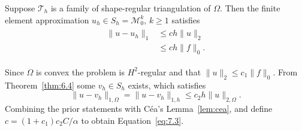 \begin{thmx}{\quad}
    Suppose $\mathcal{T}_h$ is a family of shape-regular triangulation of $\Omega$. 
    Then the finite element approximation $u_h\in S_h = \mathcal{M}^k_0$, $k\geq 1$ satisfies
    \begin{align}
        \begin{split}
            \|u-u_h\|_1&\leq ch\|u\|_2\ \\
            &\leq ch\|f\|_0.
        \end{split}
        \label{eq:7.3}
    \end{align}\label{thm:7.3}
\end{thmx}
\begin{bev}
    Since $\Omega$ is convex the problem is $H^2$-regular and that $\|u\|_2 \leq c_1\|f\|_0$.
    From Theorem~\ref{thm:6.4} some $v_h\in S_h$ exists, which satisfies
    \begin{equation}
    \|u-v_h\|_{1,\Omega} = \|u-v_h\|_{1,h} \leq c_2h\|u\|_{2,\Omega}.
    \end{equation}
    Combining the prior statements with Céa's Lemma~\ref{lem:cea}, and 
    define $c = (1+c_1)c_2C/\alpha$ 
    to obtain Equation~\ref{eq:7.3}.
\end{bev}